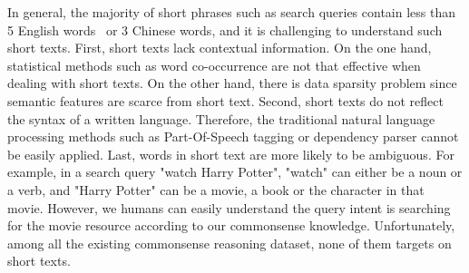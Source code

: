 







In general, the majority of short phrases such as search queries contain less than 5
English words~\cite{hua2015short} or 3 Chinese words,
and it is challenging to understand such short texts. %
First, short texts lack contextual information. On the one hand, 
statistical methods such as word co-occurrence are not that effective when dealing
with short texts. On the other hand, there is data sparsity problem since 
semantic features are scarce from short text. 
Second, short texts do not reflect the syntax of a written language. 
Therefore, the traditional natural language processing methods such as Part-Of-Speech tagging or dependency parser %
cannot be easily applied. 
Last, words in short text are more likely to be ambiguous. For example, in a search query "watch Harry Potter", %
"watch" can either be a noun or a verb, and 
"Harry Potter" can be a movie, a book or the character in that movie. 
However, we humans can easily understand the query intent is searching for the movie resource %
according to our commonsense knowledge.
Unfortunately, among all the existing commonsense reasoning dataset, none of them targets on short texts.%

